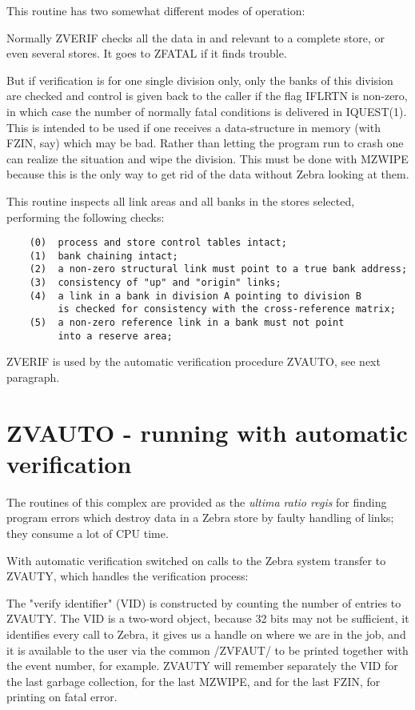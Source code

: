 This routine has two somewhat different modes of operation:

Normally ZVERIF checks all the data in and relevant to a complete
store, or even several stores. It goes to ZFATAL if it finds
trouble.

But if verification is for one single division only, only the banks
of this division are checked and control is given back to the caller
if the flag IFLRTN is non-zero, in which case the number of
normally fatal conditions is delivered in IQUEST(1).
This is intended to be used if one receives a data-structure
in memory (with FZIN, say) which may be bad. Rather than letting
the program run to crash one can realize the situation and
wipe the division. This must be done with MZWIPE because this
is the only way to get rid of the data without Zebra looking
at them.

This routine inspects all link areas and all banks in the stores
selected, performing the following checks:

\begin{verbatim}
    (0)  process and store control tables intact;
    (1)  bank chaining intact;
    (2)  a non-zero structural link must point to a true bank address;
    (3)  consistency of "up" and "origin" links;
    (4)  a link in a bank in division A pointing to division B
         is checked for consistency with the cross-reference matrix;
    (5)  a non-zero reference link in a bank must not point
         into a reserve area;
\end{verbatim} 

ZVERIF is used by the automatic verification procedure
ZVAUTO, see next paragraph.

\section{ZVAUTO - running with automatic verification}

The routines of this complex are provided as the {\it ultima ratio regis}
for finding program errors which destroy data in a Zebra store
by faulty handling of links; they consume a lot of CPU time.

With automatic verification switched on calls to the Zebra system
transfer to ZVAUTY,
which handles the verification process:

The "verify identifier" (VID) is constructed by counting the number
of entries to ZVAUTY. The VID is a two-word object, because 32 bits
may not be sufficient, it identifies every call to Zebra, it gives
us a handle on where we are in the job, and it is available to the
user via the common /ZVFAUT/ to be printed together with the event
number, for example. ZVAUTY will remember separately the VID for the
last garbage collection, for the last MZWIPE, and for the last FZIN,
for printing on fatal error.

